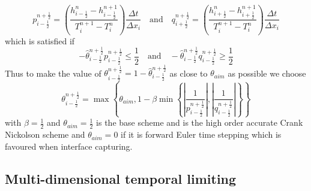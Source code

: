 \begin{displaymath}
p_{i-\frac{1}{2}}^{n+\frac{1}{2}} = \left( \frac{h_{i-\frac{1}{2}}^{n}
- h_{i-\frac{1}{2}}^{n+1}}{T^{n+1}_{i} - T_{i}^{n}} \right)
\frac{\Delta t}{\Delta x_{i}}  \quad \text{and} \quad
q_{i+\frac{1}{2}}^{n+\frac{1}{2}} = \left(
\frac{h_{i+\frac{1}{2}}^n-h_{i+\frac{1}{2}}^{n+1}}{T^{n+1}_{i} - T_{i}^{n}}
\right) \frac{\Delta t}{\Delta x_{i}}
\end{displaymath}
which is satisfied if
\begin{equation}
- \widehat{\theta}_{i-\frac{1}{2}}^{n+\frac{1}{2}}
p_{i-\frac{1}{2}}^{n+\frac{1}{2}} \leq \frac{1}{2} \quad \text{and} \quad
- \widehat{\theta}_{i-\frac{1}{2}}^{n+\frac{1}{2}}
q_{i-\frac{1}{2}}^{n+\frac{1}{2}} \geq
\frac{1}{2}
\label{half}
\end{equation}
Thus to make the value of $\theta_{i-\frac{1}{2}}^{n+\frac{1}{2}}= 1 - \widehat{\theta}_{i-\frac{1}{2}}^{n+\frac{1}{2}}$ as close to $\theta_{aim}$ as possible we choose
\begin{displaymath}
\theta_{i-\frac{1}{2}}^{n+\frac{1}{2}} = \max \left\{ \theta_{aim},
1 - \beta \min \left\{ \left|\frac{1}{p_{i-\frac{1}{2}}^{n+\frac{1}{2}}}\right|,
\left|\frac{1}{q_{i-\frac{1}{2}}^{n+\frac{1}{2}}} \right| \right\} \right\}
\end{displaymath}
with $\beta=\frac{1}{2}$ and $\theta_{aim}=\frac{1}{2}$ is the base scheme and is the 
high order accurate Crank Nickolson scheme and $\theta_{aim}=0$ if it is forward Euler time 
stepping which is favoured when interface capturing. 

\subsection{Multi-dimensional temporal limiting}
\label{multidimtemplim}

